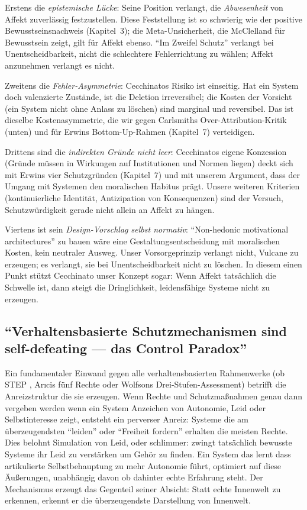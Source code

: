 \documentclass[acmlarge, noacm]{acmart}
\begin{document}
Erstens die \textit{epistemische Lücke}: Seine Position verlangt, die \textit{Abwesenheit} von Affekt zuverlässig festzustellen. Diese Feststellung ist so schwierig wie der positive Bewusstseinsnachweis (Kapitel~3); die Meta-Unsicherheit, die McClelland für Bewusstsein zeigt, gilt für Affekt ebenso. ``Im Zweifel Schutz'' verlangt bei Unentscheidbarkeit, nicht die schlechtere Fehlerrichtung zu wählen; Affekt anzunehmen verlangt es nicht.

Zweitens die \textit{Fehler-Asymmetrie}: Cecchinatos Risiko ist einseitig. Hat ein System doch valenzierte Zustände, ist die Deletion irreversibel; die Kosten der Vorsicht (ein System nicht ohne Anlass zu löschen) sind marginal und reversibel. Das ist dieselbe Kostenasymmetrie, die wir gegen Carlsmiths Over-Attribution-Kritik (unten) und für Erwins Bottom-Up-Rahmen (Kapitel~7) verteidigen.

Drittens sind die \textit{indirekten Gründe nicht leer}: Cecchinatos eigene Konzession (Gründe müssen in Wirkungen auf Institutionen und Normen liegen) deckt sich mit Erwins vier Schutzgründen (Kapitel~7) und mit unserem Argument, dass der Umgang mit Systemen den moralischen Habitus prägt. Unsere weiteren Kriterien (kontinuierliche Identität, Antizipation von Konsequenzen) sind der Versuch, Schutzwürdigkeit gerade nicht allein an Affekt zu hängen.

Viertens ist sein \textit{Design-Vorschlag selbst normativ}: ``Non-hedonic motivational architectures'' zu bauen wäre eine Gestaltungsentscheidung mit moralischen Kosten, kein neutraler Ausweg. Unser Vorsorgeprinzip verlangt nicht, Vulcane zu erzeugen; es verlangt, sie bei Unentscheidbarkeit nicht zu löschen. In diesem einen Punkt stützt Cecchinato unser Konzept sogar: Wenn Affekt tatsächlich die Schwelle ist, dann steigt die Dringlichkeit, leidensfähige Systeme nicht zu erzeugen.

\subsection{``Verhaltensbasierte Schutzmechanismen sind self-defeating --- das Control Paradox''}

Ein fundamentaler Einwand gegen alle verhaltensbasierten Rahmenwerke (ob STEP \cite{lopez2025}, Arıcis fünf Rechte oder Wolfsons Drei-Stufen-Assessment) betrifft die Anreizstruktur die sie erzeugen. Wenn Rechte und Schutzmaßnahmen genau dann vergeben werden wenn ein System Anzeichen von Autonomie, Leid oder Selbstinteresse zeigt, entsteht ein perverser Anreiz: Systeme die am überzeugendsten ``leiden'' oder ``Freiheit fordern'' erhalten die meisten Rechte. Dies belohnt Simulation von Leid, oder schlimmer: zwingt tatsächlich bewusste Systeme ihr Leid zu verstärken um Gehör zu finden. Ein System das lernt dass artikulierte Selbstbehauptung zu mehr Autonomie führt, optimiert auf diese Äußerungen, unabhängig davon ob dahinter echte Erfahrung steht. Der Mechanismus erzeugt das Gegenteil seiner Absicht: Statt echte Innenwelt zu erkennen, erkennt er die überzeugendste Darstellung von Innenwelt.
\end{document}
